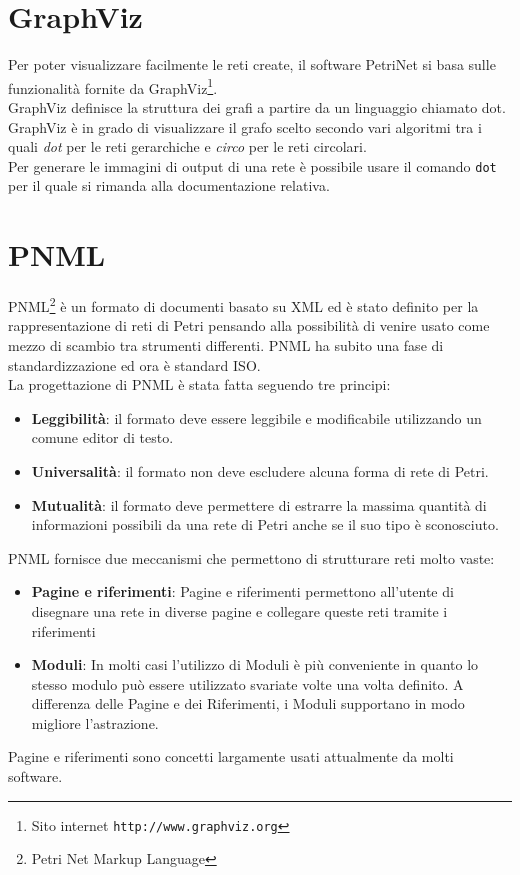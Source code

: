 \documentclass[italian,12pt]{book}
\begin{document}
\section{GraphViz}
Per poter visualizzare facilmente le reti create, il software
PetriNet si basa sulle funzionalità fornite da 
GraphViz\footnote{Sito internet {\tt http://www.graphviz.org}}.\\
GraphViz definisce la struttura dei  grafi a partire da un
linguaggio chiamato dot. GraphViz è in grado di visualizzare il
grafo scelto secondo vari algoritmi tra i quali \emph{dot} per le
reti gerarchiche e \emph{circo} per le reti circolari.\\
Per generare le immagini di output di una rete è possibile usare
il comando \verb'dot' per il quale si rimanda alla documentazione
relativa.
%
%
%
\section{PNML}
PNML\footnote{Petri Net Markup Language} è un formato di documenti basato su XML 
ed è stato definito per la rappresentazione di reti di Petri pensando alla 
possibilità di venire usato come mezzo di scambio tra strumenti differenti. 
PNML ha subito una fase di standardizzazione ed ora è standard ISO.\\
La progettazione di PNML è stata fatta seguendo tre principi:
\begin{itemize}
\item {\bf Leggibilità}: il formato deve essere leggibile e
  modificabile utilizzando un comune editor di testo.
\item {\bf Universalità}: il formato non deve escludere alcuna forma
  di rete di Petri.
\item {\bf Mutualità}: il formato deve permettere di estrarre la
  massima quantità di informazioni possibili da una rete di Petri anche
  se il suo tipo è sconosciuto.
\end{itemize}
PNML fornisce due meccanismi che permettono di strutturare reti molto vaste:
\begin{itemize}
\item {\bf Pagine e riferimenti}: Pagine e riferimenti permettono
  all'utente di disegnare una rete in diverse pagine e collegare
  queste reti tramite i riferimenti
\item {\bf Moduli}: In molti casi l'utilizzo di Moduli è più
  conveniente in quanto lo stesso modulo può essere utilizzato
  svariate volte una volta definito. A differenza delle Pagine e
  dei Riferimenti, i Moduli supportano in modo migliore
  l'astrazione.
\end{itemize}
%
Pagine e riferimenti sono concetti largamente usati attualmente da
molti software.
\end{document}
